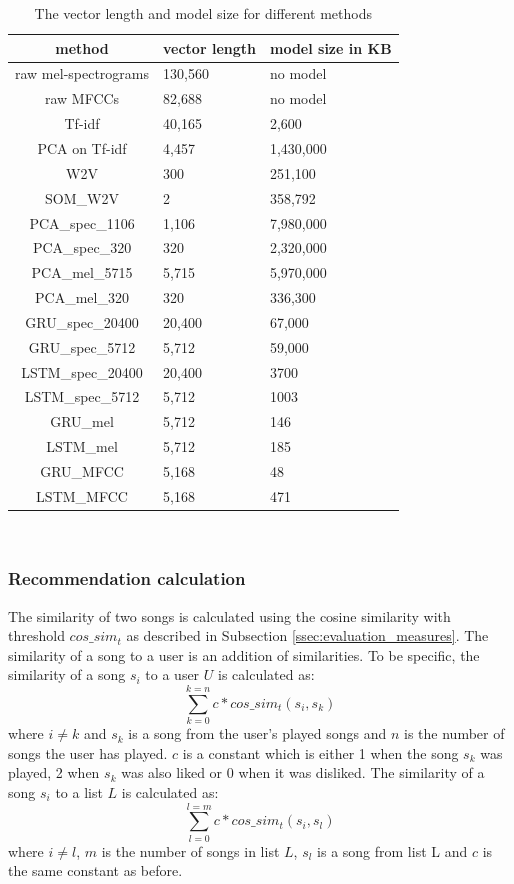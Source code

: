 \begin{table}[h]
\centering
\renewcommand{\arraystretch}{1.5}
\begin{tabu} to 1\textwidth {| c || X[c] | X[c] | }
 \hline
 \textbf{method} & \textbf{vector length} & \textbf{model size in KB} \\
 \hline
 raw mel-spectrograms & 130,560 & no model \\
 \hline 
 raw MFCCs & 82,688 & no model \\
 \hline
 Tf-idf & 40,165 & 2,600 \\
 \hline
 PCA on Tf-idf & 4,457 & 1,430,000  \\
 \hline
 W2V & 300 & 251,100 \\
 \hline
 SOM\_W2V & 2 & 358,792 \\
 \hline
 PCA\_spec\_1106 & 1,106 & 7,980,000 \\
 \hline
 PCA\_spec\_320 & 320 & 2,320,000\\
 \hline
 PCA\_mel\_5715 & 5,715 & 5,970,000\\
 \hline
 PCA\_mel\_320 & 320 & 336,300 \\
 \hline
 GRU\_spec\_20400 & 20,400 & 67,000 \\
 \hline
 GRU\_spec\_5712 & 5,712 & 59,000 \\
 \hline
 LSTM\_spec\_20400 & 20,400 & 3700 \\
 \hline
 LSTM\_spec\_5712 & 5,712 & 1003 \\
 \hline
 GRU\_mel & 5,712 & 146 \\
 \hline
 LSTM\_mel & 5,712 & 185 \\
 \hline
 GRU\_MFCC & 5,168 & 48 \\
 \hline
 LSTM\_MFCC & 5,168 & 471 \\
 \hline
 \end{tabu} \\
\caption{The vector length and model size for different methods}
\label{table:time_space_complexities}
\end{table}

\subsubsection{Recommendation calculation}\label{ssec:recom_calcs}

The similarity of two songs is calculated using the cosine similarity with threshold $cos\_sim_t$ as described in Subsection
\ref{ssec:evaluation_measures}. The similarity of a song to a user is an addition of similarities. To be specific, the similarity of a song $s_i$ to a user $U$ is calculated as: $$ \sum_{k=0}^{k=n} c*cos\_sim_t(s_i, s_k) $$  where $ i \neq k $ and $ s_k $ is a song from the user's played songs and $n$ is the number of songs the user has played. $c$ is a constant which is either 1 when the song $s_k$ was played, 2 when $s_k$ was also liked or 0 when it was disliked. 
The similarity of a song $s_i$ to a list $L$ is calculated as:
$$ \sum_{l=0}^{l=m} c*cos\_sim_t(s_i, s_l) $$ 
where $ i \neq l $, $m$ is the number of songs in list $L$, $s_l$ is a song from list L and $c$ is the same constant as before.

